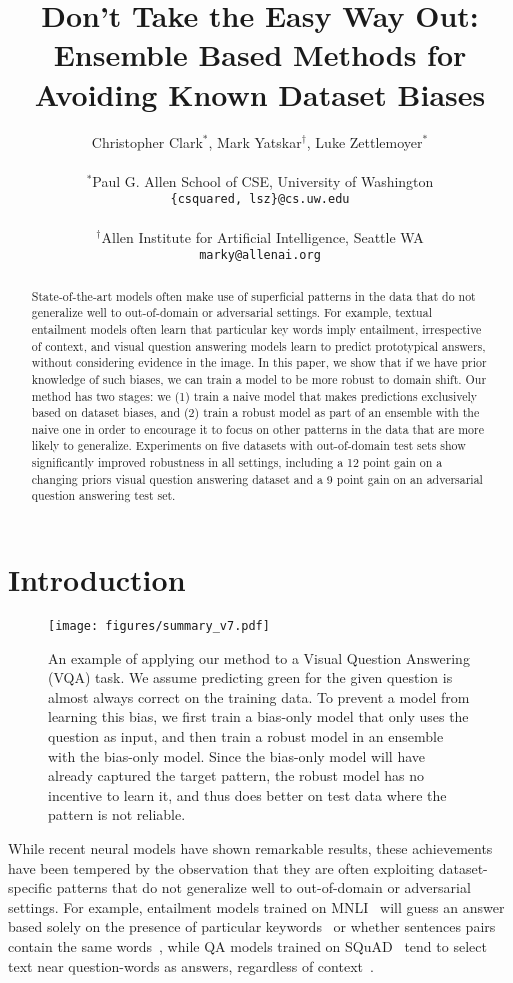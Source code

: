 \documentclass[11pt,a4paper]{article}
\title{Don't Take the Easy Way Out:\\ Ensemble Based Methods for Avoiding Known Dataset Biases}
\author{Christopher Clark$^{*}$, Mark Yatskar$^\dagger$, Luke Zettlemoyer$^{*}$ \\ \\
$^*$Paul G. Allen School of CSE, University of Washington \\
{\tt \{csquared, lsz\}@cs.uw.edu} \\ \\
$^\dagger$Allen Institute for Artificial Intelligence, Seattle WA \\
{\tt marky@allenai.org} \\
}
\date{}
\begin{document}
\maketitle

\newcommand{\tablefont}{\small}

\begin{abstract}
State-of-the-art models often make use of superficial patterns in the data that do not generalize well to out-of-domain or adversarial settings.
For example, textual entailment models often learn that particular key words imply entailment, irrespective of context, and visual question answering models learn to predict prototypical answers, without considering evidence in the image.
In this paper, we show that if we have prior knowledge of such biases, we can train a model to be more robust to domain shift.
Our method has two stages: we (1) train a naive model that makes predictions exclusively based on dataset biases, and (2) train a robust model as part of an ensemble with the naive one in order to encourage it to focus on other patterns in the data that are more likely to generalize.
Experiments on five datasets with out-of-domain test sets show significantly improved robustness in all settings, including a 12 point gain on a changing priors visual question answering dataset and a 9 point gain on an adversarial question answering test set.
\end{abstract}



%
 
\section{Introduction}
\begin{figure*}
    \centering
    \texttt{[image: figures/summary\_v7.pdf]}
    \caption{An example of applying our method to a Visual Question Answering (VQA) task. We assume predicting green for the given question is almost always correct on the training data. 
    To prevent a model from learning this bias, we first train a bias-only model that only uses the question as input, and then train a robust model in an ensemble with the bias-only model.
    Since the bias-only model will have already captured the target pattern, the robust model has no incentive to learn it, and thus does better on test data where the pattern is not reliable.}
    \label{fig:summary}
\end{figure*}

While recent neural models have shown remarkable results, these achievements have been tempered by the observation that they are often exploiting dataset-specific patterns that do not generalize well to out-of-domain or adversarial settings.
For example, entailment models trained on MNLI~\cite{bowman2015large} will guess an answer based solely on the presence of particular keywords~\cite{gururangan2018annotation} or whether sentences pairs contain the same words~\cite{mccoy2019right}, while QA models trained on SQuAD~\cite{squad} tend to select text near question-words as answers, regardless of context~\cite{adversarial_squad}.
\end{document}
